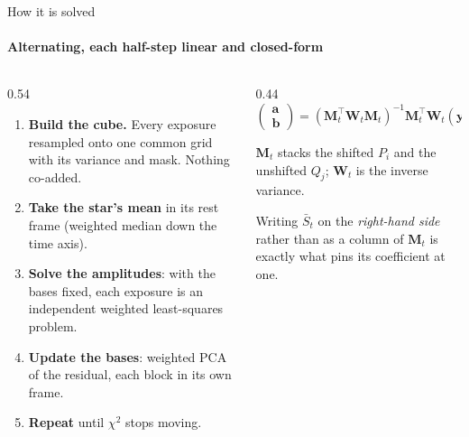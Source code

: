 \documentclass[aspectratio=169,11pt]{beamer}
\begin{document}
\begin{frame}{How it is solved}
  \framesubtitle{Alternating, each half-step linear and closed-form}

  \begin{columns}[T]
    \begin{column}{0.54\textwidth}
      \begin{enumerate}\small
        \item \textbf{Build the cube.} Every exposure resampled onto one
          common grid with its variance and mask. Nothing co-added.
        \item \textbf{Take the star's mean} in its rest frame (weighted
          median down the time axis).
        \item \textbf{Solve the amplitudes}: with the bases fixed, each
          exposure is an independent weighted least-squares problem.
        \item \textbf{Update the bases}: weighted PCA of the residual, each
          block in its own frame.
        \item \textbf{Repeat} until $\chi^2$ stops moving.
      \end{enumerate}
    \end{column}
    \begin{column}{0.44\textwidth}\small
      \begin{equation*}
        \begin{pmatrix}\mathbf{a}\\\mathbf{b}\end{pmatrix}
        = \left(\mathbf{M}_t^{\!\top}\mathbf{W}_t\mathbf{M}_t\right)^{-1}
          \mathbf{M}_t^{\!\top}\mathbf{W}_t\left(\mathbf{y}_t - \bar{S}_t\right)
      \end{equation*}

      \vspace{0.4em}
      $\mathbf{M}_t$ stacks the shifted $P_i$ and the unshifted $Q_j$;
      $\mathbf{W}_t$ is the inverse variance.

      \vspace{0.5em}
      Writing $\bar{S}_t$ on the \emph{right-hand side} rather than as a
      column of $\mathbf{M}_t$ is exactly what pins its coefficient at one.
    \end{column}
  \end{columns}
\end{frame}
\end{document}
